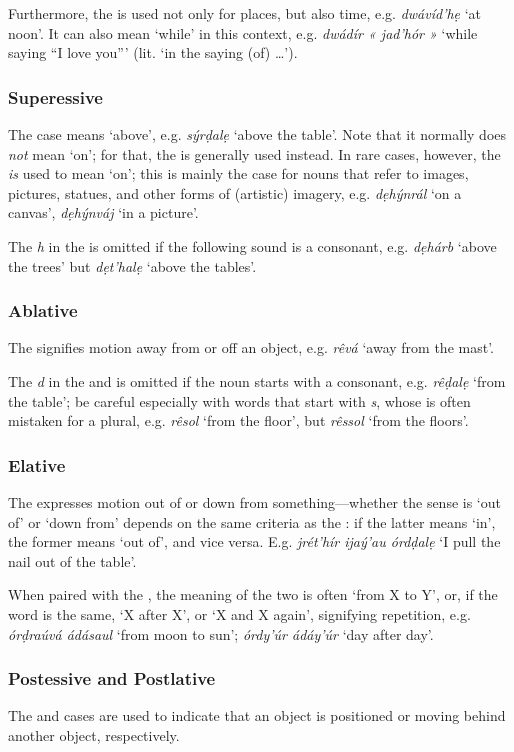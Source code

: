 \documentclass[a4paper, 12pt, twoside, final]{article}
\let \w \textit
\begin{document}
Furthermore, the  is used not only for places, but also time, e.g. \w{dwávíd’hẹ} ‘at noon’. It can also mean
‘while’ in this context, e.g. \w{dwádír « jad’hór »} ‘while saying “I love you”’ (lit. ‘in the saying (of) \ldots’).

\subsubsection{Superessive}
The  case means ‘above’, e.g. \w{sýrḍalẹ} ‘above the table’. Note that it normally does \textit{not} mean
‘on’; for that, the  is generally used instead. In rare cases, however, the  \textit{is} used to mean
‘on’; this is mainly the case for nouns that refer to images, pictures, statues, and other forms of (artistic) imagery,
e.g. \w{dẹhýnrál} ‘on a canvas’, \w{dẹhýnváj} ‘in a picture’.


The \w{h} in the  is omitted if the following sound is a consonant, e.g. \w{dẹhárb} ‘above the trees’
but \w{dẹt’halẹ} ‘above the tables’.

\subsubsection{Ablative}
The  signifies motion away from or off an object, e.g. \w{rêvá} ‘away from the mast’.

The \w{d} in the  and is omitted if the noun starts with a consonant, e.g. \w{rêḍalẹ} ‘from the table’; be
careful especially with words that start with \w{s}, whose  is often mistaken for a plural, e.g. \w{rêsol}
‘from the floor’, but \w{rêssol} ‘from the floors’.

\subsubsection{Elative}
The  expresses motion out of or down from something—whether the sense is ‘out of’ or ‘down from’ depends on the
same criteria as the : if the latter means ‘in’, the former means ‘out of’, and vice versa. E.g.
\w{jrét’hír ijaý’au órdḍalẹ} ‘I pull the nail out of the table’.

When paired with the , the meaning of the two is often ‘from X to Y’, or, if the word is the same, ‘X after X’,
or ‘X and X again’, signifying repetition, e.g. \w{órḍraúvá ádásaul} ‘from moon to sun’; \w{órdy’úr ádáy’úr} ‘day after
day’.

\subsubsection{Postessive and Postlative}
The  and  cases are used to indicate that an object is positioned or moving behind another object,
respectively.
\end{document}
